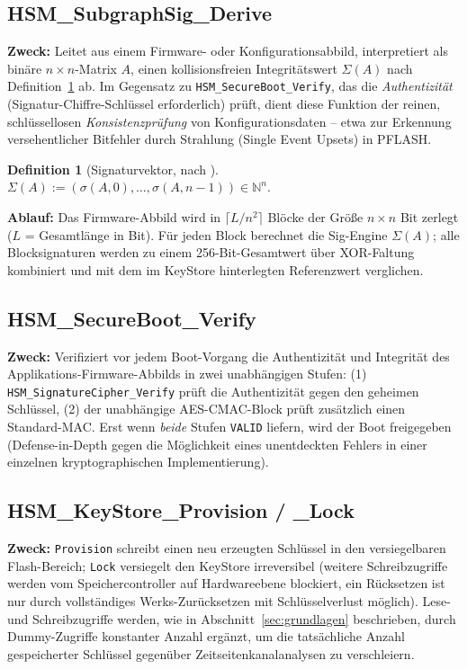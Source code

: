 ﻿\documentclass[a4paper,12pt]{article}
\theoremstyle{definition}
\newtheorem{definition}{Definition}
\begin{document}
\subsection{HSM\_SubgraphSig\_Derive}
\label{sec:funk-subgraphsig}

\textbf{Zweck:} Leitet aus einem Firmware- oder Konfigurationsabbild, interpretiert als binäre $n \times n$-Matrix $A$, einen kollisionsfreien Integritätswert $\Sigma(A)$ nach Definition~\ref{def:sigvec} ab. Im Gegensatz zu \texttt{HSM\_SecureBoot\_Verify}, das die \emph{Authentizität} (Signatur-Chiffre-Schlüssel erforderlich) prüft, dient diese Funktion der reinen, schlüssellosen \emph{Konsistenzprüfung} von Konfigurationsdaten -- etwa zur Erkennung versehentlicher Bitfehler durch Strahlung (Single Event Upsets) in PFLASH.

\begin{definition}[Signaturvektor, nach \cite{Epp26a,Epp26b}]
	\label{def:sigvec}
	$\Sigma(A) := (\sigma(A,0),\ldots,\sigma(A,n-1)) \in \mathbb{N}^n$.
\end{definition}

\textbf{Ablauf:} Das Firmware-Abbild wird in $\lceil L/n^2 \rceil$ Blöcke der Größe $n \times n$ Bit zerlegt ($L$ = Gesamtlänge in Bit). Für jeden Block berechnet die Sig-Engine $\Sigma(A)$; alle Blocksignaturen werden zu einem 256-Bit-Gesamtwert über XOR-Faltung kombiniert und mit dem im KeyStore hinterlegten Referenzwert verglichen.

\subsection{HSM\_SecureBoot\_Verify}

\textbf{Zweck:} Verifiziert vor jedem Boot-Vorgang die Authentizität und Integrität des Applikations-Firmware-Abbilds in zwei unabhängigen Stufen: (1) \texttt{HSM\_SignatureCipher\_Verify} prüft die Authentizität gegen den geheimen Schlüssel, (2) der unabhängige AES-CMAC-Block prüft zusätzlich einen Standard-MAC. Erst wenn \emph{beide} Stufen \texttt{VALID} liefern, wird der Boot freigegeben (Defense-in-Depth gegen die Möglichkeit eines unentdeckten Fehlers in einer einzelnen kryptographischen Implementierung).

\subsection{HSM\_KeyStore\_Provision / \_Lock}
\label{sec:funk-keystore}

\textbf{Zweck:} \texttt{Provision} schreibt einen neu erzeugten Schlüssel in den versiegelbaren Flash-Bereich; \texttt{Lock} versiegelt den KeyStore irreversibel (weitere Schreibzugriffe werden vom Speichercontroller auf Hardwareebene blockiert, ein Rücksetzen ist nur durch vollständiges Werks-Zurücksetzen mit Schlüsselverlust möglich). Lese- und Schreibzugriffe werden, wie in Abschnitt~\ref{sec:grundlagen} beschrieben, durch Dummy-Zugriffe konstanter Anzahl ergänzt, um die tatsächliche Anzahl gespeicherter Schlüssel gegenüber Zeitseitenkanalanalysen zu verschleiern.
\end{document}
